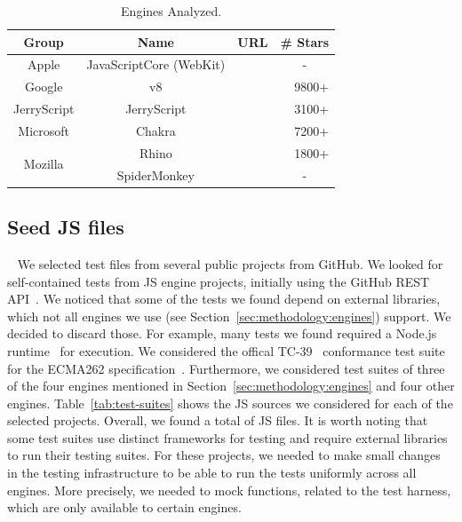 \documentclass[10pt,conference,anonymous]{IEEEtran}
\begin{document}
\begin{table}[t]
  \centering
  \caption{\label{tab:engines}Engines Analyzed.}
  \begin{tabular}{cccr}
    \toprule
    Group & Name & URL & \# Stars \\
    \midrule
    Apple & JavaScriptCore (WebKit) & \cite{jsc2018repo} & \multicolumn{1}{c}{-} \\
    Google & v8 & \cite{v82018repo} & 9800+ \\
    JerryScript & JerryScript & \cite{jerryscript2018repo} & 3100+ \\
    Microsoft & Chakra & \cite{chakra2018repo} & 7200+ \\
    \midrule
    \multirow{2}{*}{Mozilla} & Rhino & \cite{rhino2018repo} & 1800+ \\
    & SpiderMonkey & \cite{spidermonkey2018repo} & \multicolumn{1}{c}{-} \\
   \bottomrule     
  \end{tabular}
\end{table}

\subsection{Seed JS files\label{sec:seeds}}~
We selected test files from several public projects from GitHub. We
looked for self-contained tests from JS engine projects, initially
using the GitHub REST API~\cite{github-rest-api}. We noticed that some
of the tests we found depend on external libraries, which not all
engines we use (see Section~\ref{sec:methodology:engines}) support. We
decided to discard those. For example, many tests we found required a
Node.js runtime~\cite{node} for execution. We considered the offical
TC-39~\cite{tc39-github} conformance test suite for the ECMA262
specification~\cite{ecmas262-spec}. Furthermore, we considered test
suites of three of the four engines mentioned in
Section~\ref{sec:methodology:engines} and four other engines.
Table~\ref{tab:test-suites} shows the JS sources we considered for
each of the selected projects. Overall, we found a total of
\totfiles{} JS files. It is worth noting that some test suites use
distinct frameworks for testing and require external libraries to run
their testing suites.  For these projects, we needed to make small
changes in the testing infrastructure to be able to run the tests
uniformly across all engines. More precisely, we needed to mock
functions, related to the test harness, which are only available to
certain engines.
\end{document}
